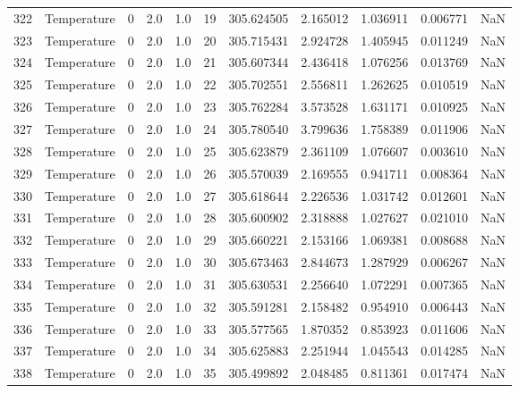 \begin{tabular}{llrrrrrrrrr}
322 &  Temperature &       0 &  2.0 &  1.0 &   19 &  305.624505 &  2.165012 &  1.036911 &   0.006771 &      NaN \\
323 &  Temperature &       0 &  2.0 &  1.0 &   20 &  305.715431 &  2.924728 &  1.405945 &   0.011249 &      NaN \\
324 &  Temperature &       0 &  2.0 &  1.0 &   21 &  305.607344 &  2.436418 &  1.076256 &   0.013769 &      NaN \\
325 &  Temperature &       0 &  2.0 &  1.0 &   22 &  305.702551 &  2.556811 &  1.262625 &   0.010519 &      NaN \\
326 &  Temperature &       0 &  2.0 &  1.0 &   23 &  305.762284 &  3.573528 &  1.631171 &   0.010925 &      NaN \\
327 &  Temperature &       0 &  2.0 &  1.0 &   24 &  305.780540 &  3.799636 &  1.758389 &   0.011906 &      NaN \\
328 &  Temperature &       0 &  2.0 &  1.0 &   25 &  305.623879 &  2.361109 &  1.076607 &   0.003610 &      NaN \\
329 &  Temperature &       0 &  2.0 &  1.0 &   26 &  305.570039 &  2.169555 &  0.941711 &   0.008364 &      NaN \\
330 &  Temperature &       0 &  2.0 &  1.0 &   27 &  305.618644 &  2.226536 &  1.031742 &   0.012601 &      NaN \\
331 &  Temperature &       0 &  2.0 &  1.0 &   28 &  305.600902 &  2.318888 &  1.027627 &   0.021010 &      NaN \\
332 &  Temperature &       0 &  2.0 &  1.0 &   29 &  305.660221 &  2.153166 &  1.069381 &   0.008688 &      NaN \\
333 &  Temperature &       0 &  2.0 &  1.0 &   30 &  305.673463 &  2.844673 &  1.287929 &   0.006267 &      NaN \\
334 &  Temperature &       0 &  2.0 &  1.0 &   31 &  305.630531 &  2.256640 &  1.072291 &   0.007365 &      NaN \\
335 &  Temperature &       0 &  2.0 &  1.0 &   32 &  305.591281 &  2.158482 &  0.954910 &   0.006443 &      NaN \\
336 &  Temperature &       0 &  2.0 &  1.0 &   33 &  305.577565 &  1.870352 &  0.853923 &   0.011606 &      NaN \\
337 &  Temperature &       0 &  2.0 &  1.0 &   34 &  305.625883 &  2.251944 &  1.045543 &   0.014285 &      NaN \\
338 &  Temperature &       0 &  2.0 &  1.0 &   35 &  305.499892 &  2.048485 &  0.811361 &   0.017474 &      NaN \\

\end{tabular}
